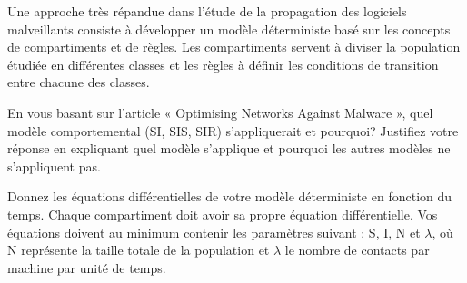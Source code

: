 


\begin{homeworkProblem}

	Une approche très répandue dans l’étude de la propagation des logiciels malveillants
	consiste à développer un modèle déterministe basé sur les concepts de compartiments et
	de règles. Les compartiments servent à diviser la population étudiée en différentes
	classes et les règles à définir les conditions de transition entre chacune des classes.

	\begin{homeworkSection}{1.1}
	
		En vous basant sur l’article « Optimising Networks Against Malware », quel
		modèle comportemental (SI, SIS, SIR) s’appliquerait et pourquoi? Justifiez votre réponse
		en expliquant quel modèle s’applique et pourquoi les autres modèles ne s’appliquent pas.\\
		
		
	\end{homeworkSection}
	
	\begin{homeworkSection}{1.2}
	
		Donnez les équations différentielles de votre modèle déterministe en fonction du temps. 
		Chaque compartiment doit avoir sa propre équation différentielle.
		Vos équations doivent au minimum contenir les paramètres suivant : S, I, N et $\lambda$, où N représente la taille totale de la population et $\lambda$ le nombre de contacts par machine par unité de temps.
		
		
	\end{homeworkSection}
\end{homeworkProblem}

